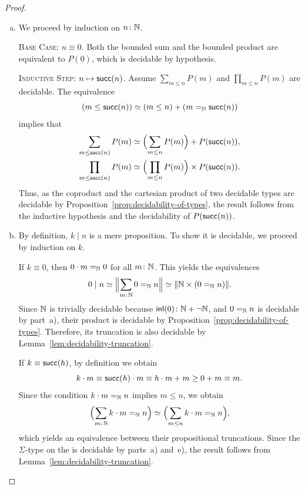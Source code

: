 \begin{proof}
\begin{enumerate}[a), font=\upshape]
        \item We proceed by induction on $n\colon\N$.

        \textsc{Base Case: $n\equiv0$.} Both the bounded sum and the bounded product are equivalent to $P(0)$, which is decidable by hypothesis.
        
        \textsc{Inductive Step: $n\mapsto\mathsf{succ}(n)$.} Assume $\sum_{m\le n}P(m)$ and $\prod_{m\le n}P(m)$ are decidable. The equivalence
        \[
            (m\le\mathsf{succ}(n))
                \simeq(m\le n)+(m\mathrel{=_{\mathbb{N}}}\mathsf{succ}(n))
        \]
        implies that
        \begin{align*}
            \sum_{m\le\mathsf{succ}(n)}P(m)
                &\simeq
                \Bigl(\sum_{m\le n}P(m)\Bigr)
                +P(\mathsf{succ}(n)),\\
            \prod_{m\le\mathsf{succ}(n)}P(m)
                &\simeq
                \Bigl(\prod_{m\le n}P(m)\Bigr)
                \times P(\mathsf{succ}(n)).
        \end{align*}
        Thus, as the coproduct and the cartesian product of two decidable types are decidable by Proposition~\ref{prop:decidability-of-types}, the result follows from the inductive hypothesis and the decidability of $P(\mathsf{succ}(n))$.

        \item By definition, $k \mid n$ is a mere proposition. To show it is decidable, we proceed by induction on $k$.
        
        If $k \equiv 0$, then $0 \cdot m \mathrel{=_{\mathbb{N}}} 0$ for all $m \colon \N$. This yields the equivalences
        \[
            0\mid n\simeq
            \Bigl\lVert
                \sum_{m\colon\N}0\eq\N n
            \Bigr\rVert
            \simeq
            \lVert\N\times(0\eq\N n)\rVert.
        \]
        Since $\mathbb{N}$ is trivially decidable because $\fun{inl}(0)\colon\N+\neg\N$, and $0\mathrel{=_{\mathbb{N}}} n$ is decidable by part~a), their product is decidable by Proposition~\ref{prop:decidability-of-types}. Therefore, its truncation is also decidable by Lemma~\ref{lem:decidability-truncation}.
        
        If $k\equiv\mathsf{succ}(h)$, by definition we obtain
        \[
            k\cdot m
                \equiv\mathsf{succ}(h)\cdot m
                \equiv h\cdot m+m
                \ge0+m
                \equiv m.
        \]
        Since the condition $k\cdot m\mathrel{=_{\mathbb{N}}} n$ implies $m\le n$, we obtain
        \[
            \Bigl(
                \sum_{m\colon\N}k\cdot m\eq\N n
            \Bigr)
            \simeq
            \Bigl(
                \sum_{m\le n}k\cdot m\eq\N n
            \Bigr),
        \]
        which yields an equivalence between their propositional truncations. Since the $\Sigma$-type on the \rhs is decidable by parts~a) and~e), the result follows from Lemma~\ref{lem:decidability-truncation}.
    \end{enumerate}
\end{proof}


